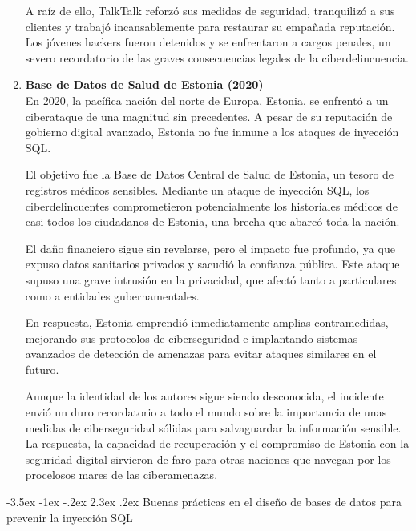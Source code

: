 \documentclass[11pt]{report}
\makeatletter
\renewcommand\chapter{\@startsection{chapter}{0}{\z@}%
    {-3.5ex \@plus -1ex \@minus -.2ex}%
    {2.3ex \@plus.2ex}%
    {\normalfont\Large\bfseries}}
\makeatother
\begin{document}
\begin{enumerate}
  A raíz de ello, TalkTalk reforzó sus medidas de seguridad, tranquilizó a sus clientes y trabajó incansablemente para restaurar su empañada reputación. Los jóvenes
  hackers fueron detenidos y se enfrentaron a cargos penales, un severo recordatorio de las graves consecuencias legales de la ciberdelincuencia.

  \item \textbf{Base de Datos de Salud de Estonia (2020)} \\
  En 2020, la pacífica nación del norte de Europa, Estonia, se enfrentó a un ciberataque de una magnitud sin precedentes. A pesar de su reputación de gobierno digital avanzado,
  Estonia no fue inmune a los ataques de inyección SQL.

  El objetivo fue la Base de Datos Central de Salud de Estonia, un tesoro de registros médicos sensibles. Mediante un ataque de inyección SQL, los ciberdelincuentes comprometieron
  potencialmente los historiales médicos de casi todos los ciudadanos de Estonia, una brecha que abarcó toda la nación.
  
  El daño financiero sigue sin revelarse, pero el impacto fue profundo, ya que expuso datos sanitarios privados y sacudió la confianza pública. Este ataque supuso una grave intrusión
  en la privacidad, que afectó tanto a particulares como a entidades gubernamentales.
  
  En respuesta, Estonia emprendió inmediatamente amplias contramedidas, mejorando sus protocolos de ciberseguridad e implantando sistemas avanzados de detección de amenazas para evitar
  ataques similares en el futuro.
  
  Aunque la identidad de los autores sigue siendo desconocida, el incidente envió un duro recordatorio a todo el mundo sobre la importancia de unas medidas de ciberseguridad sólidas para
  salvaguardar la información sensible. La respuesta, la capacidad de recuperación y el compromiso de Estonia con la seguridad digital sirvieron de faro para otras naciones que navegan por
  los procelosos mares de las ciberamenazas.
  
\end{enumerate}

\cleardoublepage

\chapter{Buenas prácticas en el diseño de bases de datos para prevenir la inyección SQL}
\end{document}
